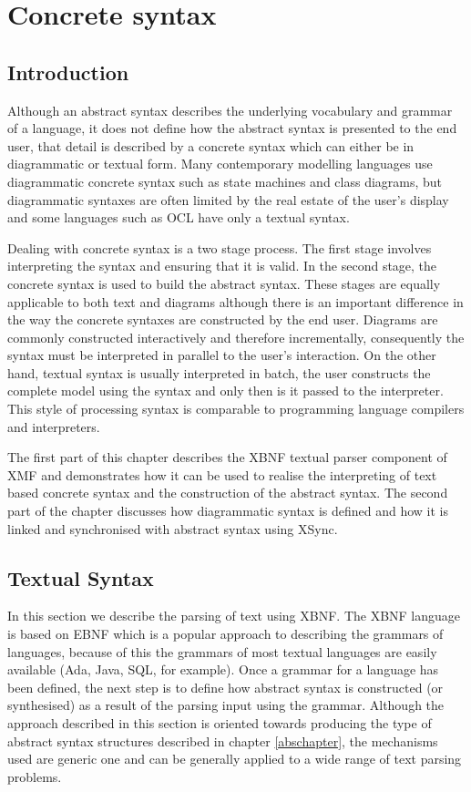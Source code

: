 \chapter{Concrete syntax}
\label{concretechapter}

\section{Introduction}

Although an abstract syntax describes the underlying vocabulary and grammar of a language, it does not define how the abstract syntax is presented to the end user, that detail is described by a concrete syntax which can either be in diagrammatic or textual form.  Many contemporary modelling languages use diagrammatic concrete syntax such as state machines and class diagrams, but diagrammatic syntaxes are often limited by the real estate of the user's display and some languages such as OCL have only a textual syntax.

Dealing with concrete syntax is a two stage process.  The first stage involves interpreting the syntax and ensuring that it is valid.  In the second stage, the concrete syntax is used to build the abstract syntax.  These stages are equally applicable to both text and diagrams although there is an important difference in the way the concrete syntaxes are constructed by the end user. Diagrams are commonly constructed interactively and therefore incrementally, consequently the syntax must be interpreted in parallel to the user's interaction.  On the other hand, textual syntax is usually interpreted in batch, the user constructs the complete model using the syntax and only then is it passed to the interpreter.  This style of processing syntax is comparable to programming language compilers and interpreters.

The first part of this chapter describes the XBNF textual parser component of XMF and demonstrates how it can be used to realise the interpreting of text based concrete syntax and the construction of the abstract syntax.  The second part of the chapter discusses how diagrammatic syntax is defined and how it is linked and synchronised with abstract syntax using XSync.

\section{Textual Syntax}

In this section we describe the parsing of text using XBNF.  The XBNF language is based on EBNF which is a popular approach to describing the grammars of languages, because of this the grammars of most textual languages are easily available (Ada, Java, SQL, for example).  Once a grammar for a language has been defined, the next step is to define how abstract syntax is constructed (or synthesised) as a result of the parsing input using the grammar.  Although the approach described in this section is oriented towards producing the type of abstract syntax structures described in chapter \ref{abschapter}, the mechanisms used are generic one and can be generally applied to a wide range of text parsing problems.


